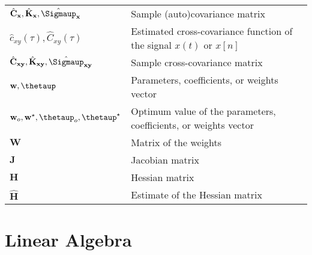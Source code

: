 \documentclass{article}
\begin{document}
\begin{xltabular}{\textwidth}{XX}
    \(\hat{\mathbf{C}}_\mathbf{x}, \hat{\mathbf{K}}_\mathbf{x}, \hat{\boldsymbol{\Sigmaup}}_\mathbf{x}\) & Sample (auto)covariance matrix \\
    \(\hat{c}_{xy}(\tau), \hat{C}_{xy}(\tau)\) & Estimated cross-covariance function of the signal \(x(t)\) or \(x[n]\)\\
    \(\hat{\mathbf{C}}_{\mathbf{xy}}, \hat{\mathbf{K}}_{\mathbf{xy}}, \hat{\boldsymbol{\Sigmaup}}_{\mathbf{xy}}\) & Sample cross-covariance matrix \\
    \(\mathbf{w}, \boldsymbol{\thetaup}\) & Parameters, coefficients, or weights vector \\
    \(\mathbf{w}_o, \mathbf{w}^{\star}, \boldsymbol{\thetaup}_o, \boldsymbol{\thetaup}^{\star}\) & Optimum value of the parameters, coefficients, or weights vector \\
    \(\mathbf{W}\) & Matrix of the weights \\
    \(\mathbf{J}\) & Jacobian matrix\\
    \(\mathbf{H}\) & Hessian matrix \\
    \(\hat{\mathbf{H}}\) & Estimate of the Hessian matrix
\end{xltabular}

\section{Linear Algebra}
\end{document}
